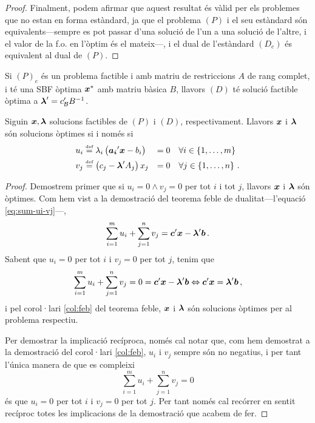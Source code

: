 \begin{teo}
\begin{proof}
    	Finalment, podem afirmar que aquest resultat és vàlid per els problemes que no estan en forma estàndard, ja que el problema $(P)$ i el seu estàndard són equivalents---sempre es pot passar d'una solució de l'un a una solució de l'altre, i el valor de la f.o. en l'òptim és el mateix---, i el dual de l'estàndard $(D_e)$ és equivalent al dual de $(P)$.
    \end{proof}
\end{teo}

\begin{col}
    Si $\left(P\right)_e$ és un problema factible i amb matriu de restriccions $A$ de rang complet, i té una SBF òptima $\boldsymbol{x}^\ast$ amb matriu bàsica $B$, llavors $\left(D\right)$ té solució factible òptima a $\boldsymbol{\lambda}' = c_{\mathcal{B}}'B^{-1}$.
\end{col}

\begin{teo}\label{teo:folga-complement}
    Siguin $\boldsymbol{x}, \boldsymbol{\lambda}$ solucions factibles de $\left(P\right)$ i $\left(D\right)$, respectivament. Llavors $\boldsymbol{x}$ i $\boldsymbol{\lambda}$ són solucions òptimes si i només si
    \begin{alignat*}{2}{}
        u_i &\stackrel{\text{\tiny def}}{=} \lambda_i \left(\boldsymbol{a_i}'\boldsymbol{x} - b_i\right) &= 0 &\quad \forall i \in \left\{1, \dots, m\right\} \\
        v_j &\stackrel{\text{\tiny def}}{=} \left(c_j - \boldsymbol{\lambda}'A_j\right) x_j &= 0 &\quad \forall j \in \left\{1, \dots, n\right\}\,.
    \end{alignat*}
    \begin{proof}
    	Demostrem primer que si $u_i = 0 \land v_j = 0$ per tot $i$ i tot $j$, llavors $\boldsymbol{x}$ i $\boldsymbol{\lambda}$ són òptimes. Com hem vist a la demostració del teorema feble de dualitat---l'equació \eqref{eq:sum-ui-vj}---, 
    	\begin{equation*}
	    	\sum_{i = 1}^{m} u_i + \sum_{j = 1}^{n} v_j = \boldsymbol{c}'\boldsymbol{x} - \boldsymbol{\lambda}'\boldsymbol{b}\,.
    	\end{equation*}
    	Sabent que $u_i = 0$ per tot $i$ i $v_j = 0$ per tot $j$, tenim que \[\sum_{i = 1}^{m} u_i + \sum_{j = 1}^{n} v_j = 0 = \boldsymbol{c}'\boldsymbol{x} - \boldsymbol{\lambda}'\boldsymbol{b} \Leftrightarrow \boldsymbol{c}'\boldsymbol{x} = \boldsymbol{\lambda}'\boldsymbol{b}\,,  \] i pel corol·lari \ref{col:feb} del teorema feble, $\boldsymbol{x}$ i $\boldsymbol{\lambda}$ són solucions òptimes per al problema respectiu.
    	
    	Per demostrar la implicació recíproca, només cal notar que, com hem demostrat a la demostració del corol·lari \ref{col:feb}, $u_i$ i $v_j$ sempre són no negatius, i per tant l'única manera de que es compleixi \[\sum_{i=1}^{m} u_i + \sum_{j=1}^{n} v_j = 0 \] és que $u_i = 0$ per tot $i$ i $v_j = 0$ per tot $j$. Per tant només cal recórrer en sentit recíproc totes les implicacions de la demostració que acabem de fer.
    \end{proof}
\end{teo}

